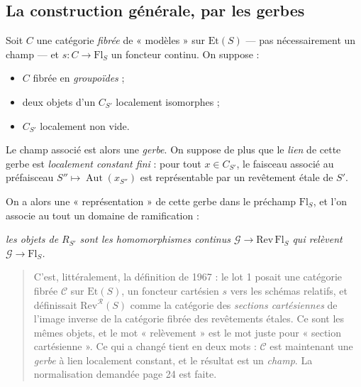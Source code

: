 \documentclass[11pt,a4paper]{article}
\begin{document}
\subsection*{La construction générale, par les gerbes}

Soit $C$ une catégorie \emph{fibrée} de « modèles » sur $\mathrm{Et}(S)$ ---
pas nécessairement un champ --- et $s : C \to \mathrm{Fl}_{S}$ un foncteur
continu. On suppose :

\begin{itemize}
  \item $C$ fibrée en \emph{groupoïdes} ;
  \item deux objets d'un $C_{S'}$ localement isomorphes ;
  \item $C_{S'}$ localement non vide.
\end{itemize}

Le champ associé est alors une \emph{gerbe}. On suppose de plus que le
\emph{lien} de cette gerbe est \emph{localement constant fini} : pour tout
$x \in C_{S'}$, le faisceau associé au préfaisceau $S'' \mapsto
\operatorname{Aut}(x_{S''})$ est représentable par un revêtement étale de
$S'$.

On a alors une « représentation » de cette gerbe dans le préchamp
$\mathrm{Fl}_{S}$, et l'on associe au tout un domaine de ramification :


\emph{les objets de $R_{S'}$ sont les homomorphismes continus
$\mathcal{G} \to \mathrm{Rev}\,\mathrm{Fl}_{S}$ qui relèvent
$\mathcal{G} \to \mathrm{Fl}_{S}$.}

\begin{quote}
C'est, littéralement, la définition de 1967 : le lot 1 posait une catégorie
fibrée $\mathcal{C}$ sur $\mathrm{Et}(S)$, un foncteur cartésien $s$ vers les
schémas relatifs, et définissait $\mathrm{Rev}^{\mathcal{R}}(S)$ comme la
catégorie des \emph{sections cartésiennes} de l'image inverse de la catégorie
fibrée des revêtements étales. Ce sont les mêmes objets, et le mot
« relèvement » est le mot juste pour « section cartésienne ». Ce qui a changé
tient en deux mots : $\mathcal{C}$ est maintenant une \emph{gerbe} à lien
localement constant, et le résultat est un \emph{champ}. La normalisation
demandée page 24 est faite.
\end{quote}
\end{document}
